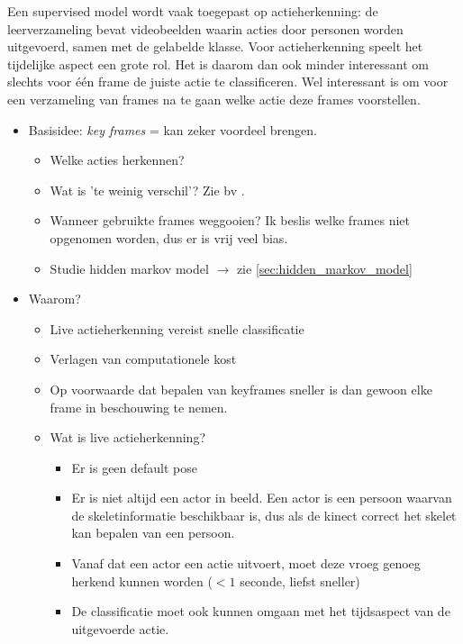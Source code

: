 Een supervised model wordt vaak toegepast op actieherkenning: de leerverzameling bevat videobeelden waarin acties door personen worden uitgevoerd, samen met de gelabelde klasse. Voor actieherkenning speelt het tijdelijke aspect een grote rol. Het is daarom dan ook minder interessant om slechts voor één frame de juiste actie te classificeren. Wel interessant is om voor een verzameling van frames na te gaan welke actie deze frames voorstellen. 



\begin{itemize}
	\item Basisidee: \textit{key frames} = kan zeker voordeel brengen.
	
	\begin{itemize}
		\item Welke acties herkennen?  
		\item Wat is 'te weinig verschil'? Zie bv \cite{Suolan2017}.
		\item Wanneer gebruikte frames weggooien? Ik beslis welke frames niet opgenomen worden, dus er is vrij veel bias.
		\item Studie hidden markov model $\rightarrow$ zie \ref{sec:hidden_markov_model}
	\end{itemize}

	\item Waarom? 
	\begin{itemize}
		\item Live actieherkenning vereist snelle classificatie
		\item Verlagen van computationele kost
		\item Op voorwaarde dat bepalen van keyframes sneller is dan gewoon elke frame in beschouwing te nemen. 
		\item Wat is live actieherkenning? 
		\begin{itemize}
			\item Er is geen default pose
			\item Er is niet altijd een actor in beeld. Een actor is een persoon waarvan de skeletinformatie beschikbaar is, dus als de kinect correct het skelet kan bepalen van een persoon.
			\item Vanaf dat een actor een actie uitvoert, moet deze vroeg genoeg herkend kunnen worden ($< 1$ seconde, liefst sneller)
			\item De classificatie moet ook kunnen omgaan met het tijdsaspect van de uitgevoerde actie.
		\end{itemize}


\end{itemize}
\end{itemize}

